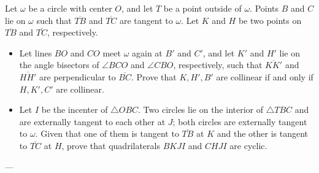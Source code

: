 Let $\omega$ be a circle with center $O$, and let $T$ be a point outside of $\omega$. Points $B$ and $C$ lie on $\omega$ such that $\overline{TB}$ and $\overline{TC}$ are tangent to $\omega$. Let $K$ and $H$ be two points on $\overline{TB}$ and $\overline{TC}$, respectively.
\begin{itemize}
\item Let lines $BO$ and $CO$ meet $\omega$ again at $B'$ and $C'$, and let $K'$ and $H'$ lie on the angle bisectors of $\angle BCO$ and $\angle CBO$, respectively, such that $\overline{KK'}$ and $\overline{HH'}$ are perpendicular to $\overline{BC}$. Prove that $K,H',B'$ are collinear if and only if $H,K',C'$ are collinear.
\item Let $I$ be the incenter of $\triangle OBC$. Two circles lie on the interior of $\triangle TBC$ and are externally tangent to each other at $J$; both circles are externally tangent to $\omega$. Given that one of them is tangent to $\overline{TB}$ at $K$ and the other is tangent to $\overline{TC}$ at $H$, prove that quadrilaterals $BKJI$ and $CHJI$ are cyclic.
\end{itemize}
---
